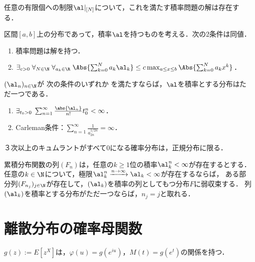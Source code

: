 \documentclass[uplatex,dvipdfmx]{jsreport}
\begin{document}
\begin{proposition}
    任意の有限個への制限$\al|_{[N]}$について，これを満たす積率問題の解は存在する．
\end{proposition}

\begin{theorem}[存在の必要十分条件]
    区間$[a,b]$上の分布であって，積率$\al$を持つものを考える．次の2条件は同値．
    \begin{enumerate}
        \item 積率問題は解を持つ．
        \item $\exists_{c>0}\;\forall_{N\in\N}\;\forall_{a_k\in\R}\;\Abs{\sum^N_{k=0}a_k\al_k}\le c\max_{a\le x\le b}\Abs{\sum^N_{k=0}a_kx^k}$．
    \end{enumerate}
\end{theorem}

\begin{theorem}[一意性の十分条件]
    $(\al_n)_{n\in\N}$が
    次の条件のいずれか
    を満たすならば，$\al$を積率とする分布はただ一つである．
    \begin{enumerate}
        \item $\exists_{t_0>0}\;\sum^\infty_{n=1}\frac{\abs{\al_n}}{n!}t^n_0<\infty$．
        \item Carleman条件\cite{Hazewinkel89-EncyclopaediaOfMath3}：$\sum_{n=1}^\infty\frac{1}{a_{2n}^{1/2n}}=\infty$．
    \end{enumerate}
\end{theorem}

\begin{example}
    ３次以上のキュムラントがすべて$0$になる確率分布は，正規分布に限る．
\end{example}

\begin{proposition}
    累積分布関数の列$(F_n)$は，任意の$k\ge1$位の積率$\al_k^n<\infty$が存在するとする．
    任意の$k\in\N$について，極限$\al_k^n\xrightarrow{n\to\infty}\al_k<\infty$が存在するならば，
    ある部分列$(F_{n_j})_{j\in\N}$が存在して，$(\al_k)$を積率の列としてもつ分布$F$に弱収束する．
    列$(\al_k)$を積率とする分布がただ一つならば，$n_j=j$と取れる．
\end{proposition}

\section{離散分布の確率母関数}

\begin{tcolorbox}[colframe=ForestGreen, colback=ForestGreen!10!white,breakable,colbacktitle=ForestGreen!40!white,coltitle=black,fonttitle=\bfseries\sffamily,
title=]
    $g(z):=E[z^X]$は，$\varphi(u)=g(e^{iu})$，$M(t)=g(e^t)$の関係を持つ．
\end{tcolorbox}
\end{document}
